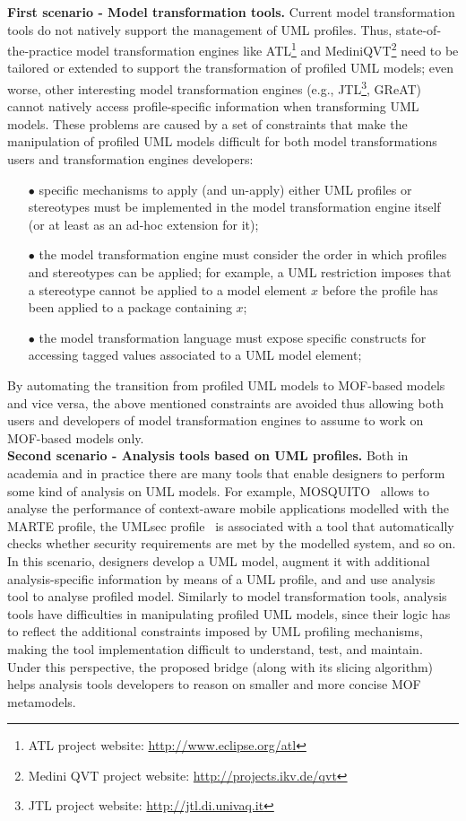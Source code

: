 \textbf{First scenario - Model transformation tools.}
Current model transformation tools do not natively support the management of UML profiles.
Thus, state-of-the-practice model transformation engines
like ATL\footnote{ATL project website: \small{\url{http://www.eclipse.org/atl}}} and
MediniQVT\footnote{Medini QVT project website: \small{\url{http://projects.ikv.de/qvt}}}
need to be tailored or extended to support the transformation of profiled UML models;
even worse, other interesting model transformation engines (e.g.,
JTL\footnote{JTL project website: \small{\url{http://jtl.di.univaq.it}}}, GReAT)
cannot natively access profile-specific information when transforming UML models.
These problems are caused by a set of constraints that make the manipulation of profiled UML models difficult for both model transformations users and transformation engines developers:
%
\begin{itemize}
	\item[$\bullet$] specific mechanisms to apply (and un-apply) either UML profiles or stereotypes must be implemented
	in the model transformation engine itself (or at least as an ad-hoc extension for it);
	\item[$\bullet$] the model transformation engine must consider the order in which profiles and stereotypes can be applied;
	for example, a UML restriction imposes that a stereotype cannot be applied to a model element $x$ before
	the profile has been applied to a package containing $x$;
	\item[$\bullet$] the model transformation language must expose specific constructs for accessing tagged values associated to a UML model element;
\end{itemize}
%
By automating the transition from profiled UML models to MOF-based models and vice versa, the above mentioned constraints
are avoided thus allowing both users and developers of model transformation engines to assume to work on MOF-based models only.\\

\textbf{Second scenario - Analysis tools based on UML profiles.}
Both in academia and in practice there are many tools that enable designers to perform some kind of analysis on UML models.
For example, MOSQUITO~\cite{perfMarte} allows to analyse the performance of context-aware mobile
applications modelled with the MARTE profile,
the UMLsec profile~\cite{securityUMLsec} is associated with a tool that automatically checks whether security
requirements are met by the modelled system, and so on.
In this scenario, designers develop a UML model, augment it with additional analysis-specific information by means of a UML profile, and and use analysis tool to analyse profiled model.
Similarly to model transformation tools, analysis tools have difficulties in manipulating profiled UML models, since
their logic has to reflect the additional constraints imposed by UML profiling mechanisms, making the tool
implementation difficult to understand, test, and maintain.
Under this perspective, the proposed bridge (along with its slicing algorithm)
helps analysis tools developers to reason on smaller and more concise MOF metamodels.\\

